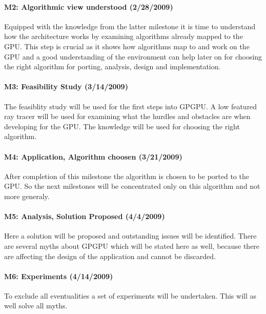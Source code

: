 \paragraph{M2: Algorithmic view understood (2/28/2009)} %
\label{par:m2_architecture_algorithmic_view_understood}
Equipped with the knowledge from the latter milestone it is time to understand
how the architecture works by examining algorithms already mapped to the GPU.
This step is crucial as it shows how algorithms map to and work on the \gls{GPU}
and a good understanding of the environment can help later on for choosing the
right algorithm for porting, analysis, design and implementation.
\paragraph{M3: Feasibility Study (3/14/2009)} %
\label{par:m3_feasibility_study}
The feasiblity study will be used for the first steps into GPGPU. A low featured
ray tracer will be used for examining what the hurdles and obstacles are when 
developing for the GPU. The knowledge will be used for choosing the right 
algorithm. 
\paragraph{M4: Application, Algorithm choosen (3/21/2009)} %
\label{par:m4_application_algorithm_choosen}
After completion of this milestone the algorithm is chosen to be ported to the 
GPU. So the next milestones will be concentrated only on this algorithm and not 
more generaly. 
\paragraph{M5: Analysis, Solution Proposed (4/4/2009)} %
\label{par:m5_analysis_solution_proposed}
Here a solution will be proposed and outstanding issues will be identified. 
There are several myths about GPGPU which will be stated here as well, because 
there are affecting the design of the application and cannot be discarded.
\paragraph{M6: Experiments (4/14/2009)} %
\label{par:m6_experiments}
To exclude all eventualities a set of experiments will be undertaken. This will 
as well solve all myths.
